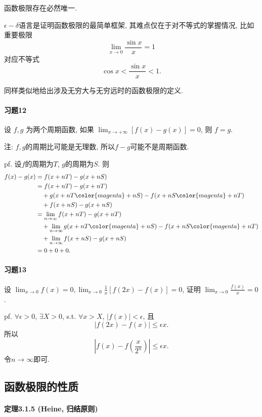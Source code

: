 函数极限存在必然唯一.

$\epsilon-\delta$语言是证明函数极限的最简单框架, 其难点仅在于对不等式的掌握情况, 比如重要极限
\[
\lim_{x\to0}\frac{\sin x}{x}=1
\]
对应不等式
\[
\cos x<\frac{\sin x}{x}<1.
\]

同样类似地给出涉及无穷大与无穷远时的函数极限的定义.

\paragraph{习题12}

设 $f,g$ 为两个周期函数, 如果 $\lim_{x\rightarrow+\infty}[f(x)-g(x)]=0$, 则
$f=g$. 

注: $f,g$的周期比可能是无理数, 所以$f-g$可能不是周期函数.

pf. 设$f$的周期为$T$, $g$的周期为$S$. 则
\begin{align*}
	f(x)-g(x) & =f(x+nT)-g(x+nS)\\
	& =f(x+nT)-g(x+nT)\\
	& \quad+g(x+nT{\color{magenta}+nS})-f(x+nS{\color{magenta}+nT})\\
	& \quad+f(x+nS)-g(x+nS)\\
	& =\lim_{n\to\infty}f(x+nT)-g(x+nT)\\
	& \quad+\lim_{n\to\infty}g(x+nT{\color{magenta}+nS})-f(x+nS{\color{magenta}+nT})\\
	& \quad+\lim_{n\to\infty}f(x+nS)-g(x+nS)\\
	& =0+0+0.
\end{align*}


\paragraph{习题13}

设 $\lim_{x\rightarrow0}f(x)=0,\lim_{x\rightarrow0}\frac{1}{x}[f(2x)-f(x)]=0$,
证明 $\lim_{x\rightarrow0}\frac{f(x)}{x}=0$.

pf. $\forall\epsilon>0$, $\exists X>0$, s.t. $\forall x>X$, $\left|f(x)\right|<\epsilon$,
且
\[
\left|f(2x)-f(x)\right|\le\epsilon x.
\]
所以
\[
\left|f(x)-f\left(\frac{x}{2^{n}}\right)\right|\le\epsilon x.
\]
令$n\to\infty$即可.

\subsection{函数极限的性质}

\paragraph{定理3.1.5 (Heine, 归结原则)}

